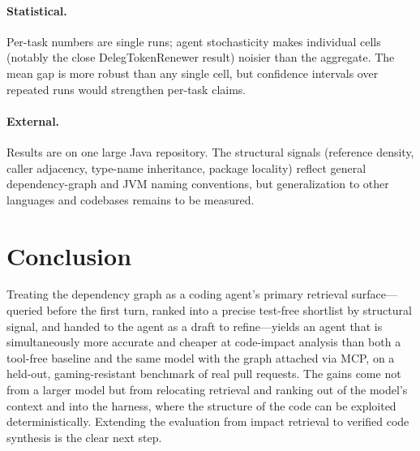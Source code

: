 \documentclass[11pt,twocolumn]{article}
\begin{document}
\paragraph{Statistical.} Per-task numbers are single runs; agent stochasticity makes individual
cells (notably the close DelegTokenRenewer result) noisier than the aggregate. The mean gap is
more robust than any single cell, but confidence intervals over repeated runs would strengthen
per-task claims.
\paragraph{External.} Results are on one large Java repository. The structural signals
(reference density, caller adjacency, type-name inheritance, package locality) reflect
general dependency-graph and JVM naming conventions, but generalization to other languages and
codebases remains to be measured.

\section{Conclusion}
Treating the dependency graph as a coding agent's primary retrieval surface---queried before the
first turn, ranked into a precise test-free shortlist by structural signal, and handed to the
agent as a draft to refine---yields an agent that is simultaneously more accurate and cheaper at
code-impact analysis than both a tool-free baseline and the same model with the graph attached
via MCP, on a held-out, gaming-resistant benchmark of real pull requests. The gains come not from
a larger model but from relocating retrieval and ranking out of the model's context and into the
harness, where the structure of the code can be exploited deterministically. Extending the
evaluation from impact retrieval to verified code synthesis is the clear next step.

\balance
\end{document}
